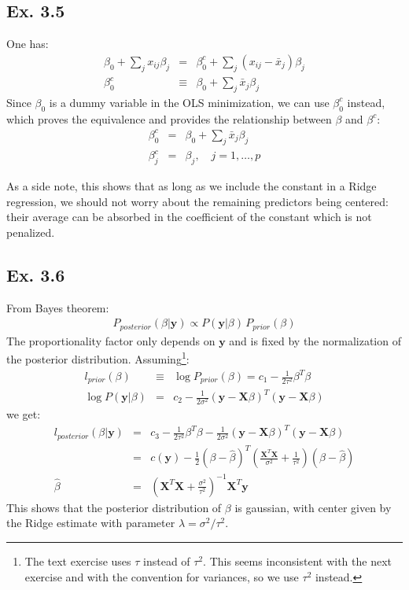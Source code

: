 \subsection*{Ex. 3.5}
One has:
\begin{eqnarray*}
\beta_0 + \sum_j x_{ij} \beta_j & = & \beta_0^c + \sum_j (x_{ij} - \bar{x}_j) \beta_j \\
\beta_0^c & \equiv & \beta_0 + \sum_j \bar{x}_j \beta_j
\end{eqnarray*}
Since $\beta_0$ is a dummy variable in the OLS minimization, we can use $\beta_0^c$ instead,
which proves the equivalence and provides the relationship between $\beta$ and $\beta^c$:
\begin{eqnarray*}
\beta_0^c & = & \beta_0 + \sum_j \bar{x}_j \beta_j \\
\beta_j^c & = & \beta_j, \quad j = 1, \ldots, p
\end{eqnarray*}

As a side note, this shows that as long as we include the constant in a Ridge regression,
we should not worry about the remaining predictors being centered: their average
can be absorbed in the coefficient of the constant which is not penalized.

\subsection*{Ex. 3.6}
From Bayes theorem:
\begin{eqnarray*}
P_{posterior}(\beta | \mathbf{y}) \propto P(\mathbf{y} | \beta) \, P_{prior}(\beta)
\end{eqnarray*}
The proportionality factor only depends on $\mathbf{y}$ and is fixed by the normalization of
the posterior distribution. Assuming\footnote{The text exercise uses $\tau$ instead of $\tau^2$. This 
seems inconsistent with the next exercise and with the convention for variances, so we use $\tau^2$ instead.}:
\begin{eqnarray*}
l_{prior}(\beta) & \equiv & \log{P_{prior}(\beta)} = c_1 - \frac{1}{2 \tau ^2} \beta^T \beta\\
\log{P(\mathbf{y} | \beta)} & = & c_2 - \frac{1}{2 \sigma^2} \left( \mathbf{y} - \mathbf{X} \beta \right)^T \left( \mathbf{y} - \mathbf{X} \beta \right) 
\end{eqnarray*}
we get:
\begin{eqnarray} \label{3p6_e1}
l_{posterior}(\beta | \mathbf{y}) & = & c_3 - \frac{1}{2 \tau^2} \beta^T \beta - \frac{1}{2 \sigma^2} \left( \mathbf{y} - \mathbf{X} \beta \right)^T \left( \mathbf{y} - \mathbf{X} \beta \right) \\ \nonumber
& = & c(\mathbf{y}) - \frac{1}{2} \left( \beta - \hat{\beta} \right) ^T \left( \frac{\mathbf{X} ^T \mathbf{X} }{ \sigma ^2} + \frac{1}{\tau^2} \right) \left( \beta - \hat{\beta} \right) \\ \nonumber
\hat{\beta} & = & \left( \mathbf{X} ^T \mathbf{X} + \frac{\sigma^2}{ \tau^2} \right)^{-1} \mathbf{X}^T \mathbf{y}
\end{eqnarray}
This shows that the posterior distribution of $\beta$ is gaussian, with center given by the Ridge estimate
with parameter $\lambda = \sigma^2 / \tau^2$.

